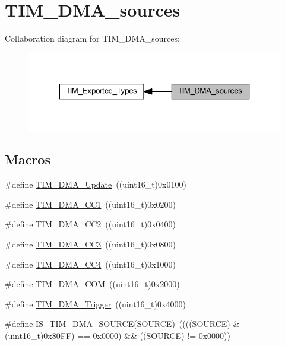 \hypertarget{group___t_i_m___d_m_a__sources}{}\section{T\+I\+M\+\_\+\+D\+M\+A\+\_\+sources}
\label{group___t_i_m___d_m_a__sources}
Collaboration diagram for T\+I\+M\+\_\+\+D\+M\+A\+\_\+sources\+:
\nopagebreak
\begin{figure}[H]
\begin{center}
\leavevmode
\includegraphics[width=323pt]{group___t_i_m___d_m_a__sources}
\end{center}
\end{figure}
\subsection*{Macros}
\begin{DoxyCompactItemize}
\item 
\#define \hyperlink{group___t_i_m___d_m_a__sources_ga013a49e5cceb263f01941aef968dea9c}{T\+I\+M\+\_\+\+D\+M\+A\+\_\+\+Update}~((uint16\+\_\+t)0x0100)
\item 
\#define \hyperlink{group___t_i_m___d_m_a__sources_ga33b93e8bb82fe8e167b9e9c962c54f83}{T\+I\+M\+\_\+\+D\+M\+A\+\_\+\+C\+C1}~((uint16\+\_\+t)0x0200)
\item 
\#define \hyperlink{group___t_i_m___d_m_a__sources_ga792f73196a8e7424655592097d7a3fd5}{T\+I\+M\+\_\+\+D\+M\+A\+\_\+\+C\+C2}~((uint16\+\_\+t)0x0400)
\item 
\#define \hyperlink{group___t_i_m___d_m_a__sources_ga3eb2dadbd3109bced45935fb53deeee1}{T\+I\+M\+\_\+\+D\+M\+A\+\_\+\+C\+C3}~((uint16\+\_\+t)0x0800)
\item 
\#define \hyperlink{group___t_i_m___d_m_a__sources_ga59495cf79894dfe5e5b2029863aed956}{T\+I\+M\+\_\+\+D\+M\+A\+\_\+\+C\+C4}~((uint16\+\_\+t)0x1000)
\item 
\#define \hyperlink{group___t_i_m___d_m_a__sources_gac5f4c56e944bda8ba0c23b97275020ba}{T\+I\+M\+\_\+\+D\+M\+A\+\_\+\+C\+OM}~((uint16\+\_\+t)0x2000)
\item 
\#define \hyperlink{group___t_i_m___d_m_a__sources_ga81ad169a378969524e61396337d84a0a}{T\+I\+M\+\_\+\+D\+M\+A\+\_\+\+Trigger}~((uint16\+\_\+t)0x4000)
\item 
\#define \hyperlink{group___t_i_m___d_m_a__sources_gafb9cb1995ea4cd37db6032d80a49cd47}{I\+S\+\_\+\+T\+I\+M\+\_\+\+D\+M\+A\+\_\+\+S\+O\+U\+R\+CE}(S\+O\+U\+R\+CE)~((((S\+O\+U\+R\+CE) \& (uint16\+\_\+t)0x80\+F\+F) == 0x0000) \&\& ((\+S\+O\+U\+R\+C\+E) != 0x0000))
\end{DoxyCompactItemize}


